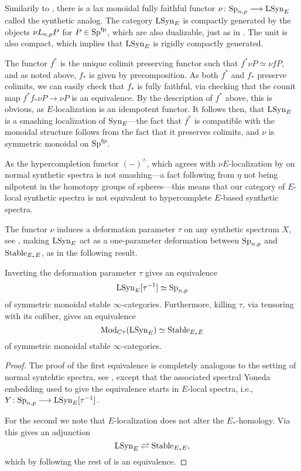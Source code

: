 Similarily to \cite[4.4, 4.38]{pstragowski_2022}, there is a lax monoidal fully faithful functor $\nu\colon\mathrm{Sp}_{n,p} \longrightarrow \mathrm{LSyn}_{E}$ called the synthetic analog. The category $\mathrm{LSyn}_{E}$ is compactly generated by the objects $\nu L_{n,p} P$ for $P\in \mathrm{Sp}^{\mathrm{fp}}$, which are also dualizable, just as in \cite[4.14]{pstragowski_2022}. The unit is also compact, which implies that $\mathrm{LSyn}_{E}$ is rigidly compactly generated. 

The functor $f^*$ is the unique colimit preserving functor such that $f^* \nu P \simeq \nu f P$, and as noted above, $f_*$ is given by precomposition. As both $f^*$ and $f_*$ preserve colimits, we can easily check that $f_*$ is fully faithful, via checking that the counit map $f^*f_* \nu P \to \nu P$ is an equivalence. By the description of $f^*$ above, this is obvious, as $E$-localization is an idempotent functor. It follows then, that $\mathrm{LSyn}_{E}$ is a smashing localization of $\mathrm{Syn}_{E}$---the fact that $f^*$ is compatible with the monoidal structure follows from the fact that it preserves colimits, and $\nu$ is symmetric monoidal on $\mathrm{Sp}^{\mathrm{fp}}$. 

\begin{remark}
    As the hypercompletion functor $(-)^\wedge$, which agrees with $\nu E$-localization by \cite[5.4]{pstragowski_2022} on normal synthetic spectra is not smashing---a fact following from $\eta$ not being nilpotent in the homotopy groups of spheres---this means that our category of $E$-local synthetic spectra is not equivalent to hypercomplete $E$-based synthetic spectra. 
\end{remark}

The functor $\nu$ induces a deformation parameter $\tau$ on any synthetic spectrum $X$, see \cite[Section 4.3]{pstragowski_2022}, making $\mathrm{LSyn}_{E}$ act as a one-parameter deformation between $\mathrm{Sp}_{n,p}$ and $\mathrm{Stable}_{E_*E}$, as in the following result. 

\begin{theorem}
    \label{ch3:add:thm:deformation-properties-of-LSynE}
    Inverting the deformation parameter $\tau$ gives an equivalence 
    \[\mathrm{LSyn}_{E}[\tau^{-1}]\simeq \mathrm{Sp}_{n,p}\]
    of symmetric monoidal stable $\infty$-categories. Furthermore, killing $\tau$, via tensoring with its cofiber, gives an equivalence 
    \[\mathrm{Mod}_{C\tau}(\mathrm{LSyn}_{E})\simeq \mathrm{Stable}_{E_*E}\]
    of symmetric monoidal stable $\infty$-categories. 
\end{theorem}
\begin{proof}
    The proof of the first equivalence is completely analogous to the setting of normal syntehtic spectra, see \cite[4.37, 4.40]{pstragowski_2022}, except that the associated spectral Yoneda embedding used to give the equivalence starts in $E$-local spectra, i.e., $Y\colon \mathrm{Sp}_{n,p} \longrightarrow \mathrm{LSyn}_{E}[\tau^{-1}]$. 

    For the second we note that $E$-localization does not alter the $E_*$-homology. Via \cite[2.22, 4.43]{pstragowski_2022} this gives an adjunction 
    \[\mathrm{LSyn}_{E} \rightleftarrows \mathrm{Stable}_{E_*E},\]
    which by following the rest of \cite[Section 4.5]{pstragowski_2022} is an equivalence. 
\end{proof}

